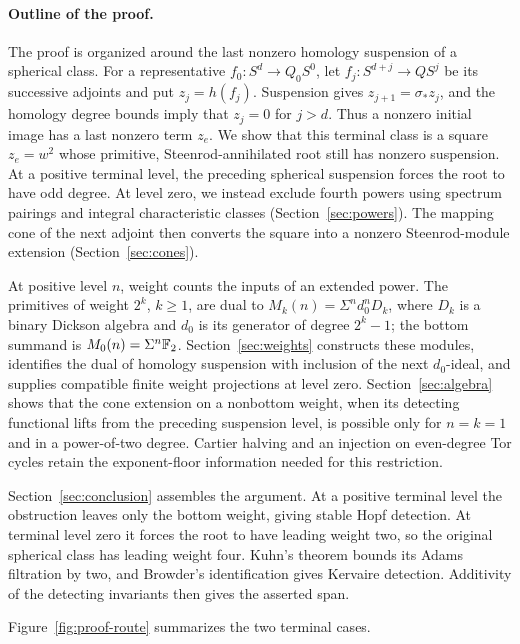\paragraph{Outline of the proof.}
The proof is organized around the last nonzero homology suspension of a
spherical class. For a representative \(f_0:S^d\to Q_0S^0\), let
\(f_j:S^{d+j}\to QS^j\) be its successive adjoints and put
\(z_j=h(f_j)\). Suspension gives \(z_{j+1}=\sigma_*z_j\), and the
homology degree bounds imply that \(z_j=0\) for \(j>d\).
Thus a nonzero initial image has a last nonzero term \(z_e\).
We show that this terminal class is a square \(z_e=w^2\) whose
primitive, Steenrod-annihilated root still has nonzero suspension.
At a positive terminal level, the preceding spherical suspension forces
the root to have odd degree. At level zero, we instead exclude fourth powers
using spectrum pairings and integral characteristic classes
(Section~\ref{sec:powers}). The mapping cone of the next adjoint then
converts the square into a nonzero Steenrod-module extension
(Section~\ref{sec:cones}).

At positive level \(n\), weight counts the inputs of an extended power.
The primitives of weight \(2^k\), \(k\ge1\),
are dual to \(M_k(n)=\Sigma^n d_0^nD_k\), where \(D_k\) is a
binary Dickson algebra and \(d_0\) is its generator of degree
\(2^k-1\); the bottom summand is \(M_0(n)=\Sigma^n\mathbb F_2\).
Section~\ref{sec:weights} constructs these modules, identifies
the dual of homology suspension with inclusion of the next \(d_0\)-ideal,
and supplies compatible finite weight projections at level zero.
Section~\ref{sec:algebra} shows that the cone extension on a nonbottom
weight, when its detecting functional lifts from the preceding
suspension level, is possible only for \(n=k=1\) and in a
power-of-two degree. Cartier halving and an injection on even-degree
Tor cycles retain the exponent-floor information needed for this
restriction.

Section~\ref{sec:conclusion} assembles the argument. At a positive
terminal level the obstruction leaves only the bottom weight, giving
stable Hopf detection. At terminal level zero it forces the root to
have leading weight two, so the original spherical class has leading
weight four. Kuhn's theorem bounds its Adams filtration by two, and
Browder's identification gives Kervaire detection. Additivity of the
detecting invariants then gives the asserted span.

Figure~\ref{fig:proof-route} summarizes the two terminal cases.


